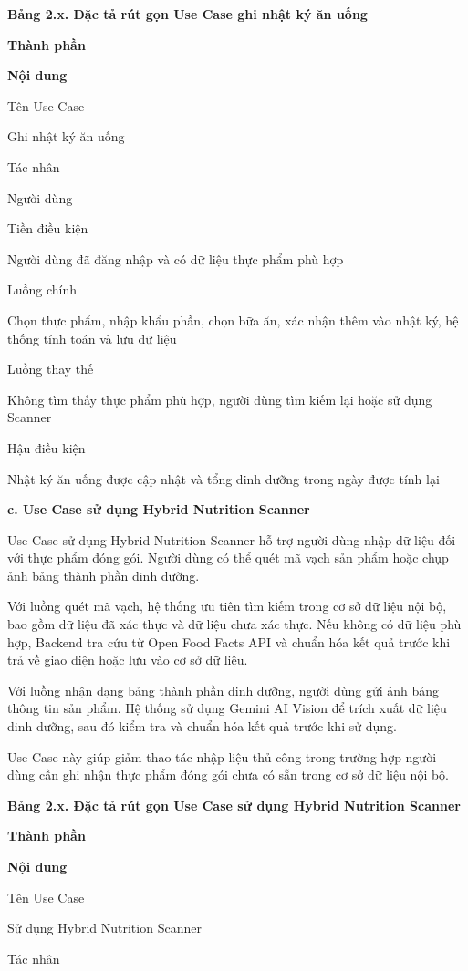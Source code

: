 \textbf{Bảng 2.x. Đặc tả rút gọn Use Case ghi nhật ký ăn uống}

\textbf{Thành phần}

\textbf{Nội dung}

Tên Use Case

Ghi nhật ký ăn uống

Tác nhân

Người dùng

Tiền điều kiện

Người dùng đã đăng nhập và có dữ liệu thực phẩm phù hợp

Luồng chính

Chọn thực phẩm, nhập khẩu phần, chọn bữa ăn, xác nhận thêm vào nhật ký, hệ thống tính toán và lưu dữ liệu

Luồng thay thế

Không tìm thấy thực phẩm phù hợp, người dùng tìm kiếm lại hoặc sử dụng Scanner

Hậu điều kiện

Nhật ký ăn uống được cập nhật và tổng dinh dưỡng trong ngày được tính lại

\textbf{c. Use Case sử dụng Hybrid Nutrition Scanner}

Use Case sử dụng Hybrid Nutrition Scanner hỗ trợ người dùng nhập dữ liệu đối với thực phẩm đóng gói. Người dùng có thể quét mã vạch sản phẩm hoặc chụp ảnh bảng thành phần dinh dưỡng.

Với luồng quét mã vạch, hệ thống ưu tiên tìm kiếm trong cơ sở dữ liệu nội bộ, bao gồm dữ liệu đã xác thực và dữ liệu chưa xác thực. Nếu không có dữ liệu phù hợp, Backend tra cứu từ Open Food Facts API và chuẩn hóa kết quả trước khi trả về giao diện hoặc lưu vào cơ sở dữ liệu.

Với luồng nhận dạng bảng thành phần dinh dưỡng, người dùng gửi ảnh bảng thông tin sản phẩm. Hệ thống sử dụng Gemini AI Vision để trích xuất dữ liệu dinh dưỡng, sau đó kiểm tra và chuẩn hóa kết quả trước khi sử dụng.

Use Case này giúp giảm thao tác nhập liệu thủ công trong trường hợp người dùng cần ghi nhận thực phẩm đóng gói chưa có sẵn trong cơ sở dữ liệu nội bộ.

\textbf{Bảng 2.x. Đặc tả rút gọn Use Case sử dụng Hybrid Nutrition Scanner}

\textbf{Thành phần}

\textbf{Nội dung}

Tên Use Case

Sử dụng Hybrid Nutrition Scanner

Tác nhân

